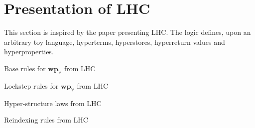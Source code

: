 \section{Presentation of LHC}

This section is inspired by the paper presenting LHC. %
The logic defines, upon an arbitrary toy language, hyperterms, hyperstores, hyperreturn values and hyperproperties.

\begin{mathfig}[\small]
  \begin{proofrules}
    

    

    

    

    

    

    
  \end{proofrules}
  \caption{Base rules for $\mathbf{wp}_{\forall}$ from LHC}
\end{mathfig}

\begin{mathfig}{\small}
  \begin{proofrules}
    

    

    

    

    

    

    

    
  \end{proofrules}
  \caption{Lockstep rules for $\mathbf{wp}_{\forall}$ from LHC}
\end{mathfig}

\begin{mathfig}{\small}
  \begin{proofrules}
    

    

    
  \end{proofrules}
  \caption{Hyper-structure laws from LHC}
\end{mathfig}

\begin{mathfig}{\small}
  \begin{proofrules}
    

    

    

    
  \end{proofrules}
  \caption{Reindexing rules from LHC}
\end{mathfig}